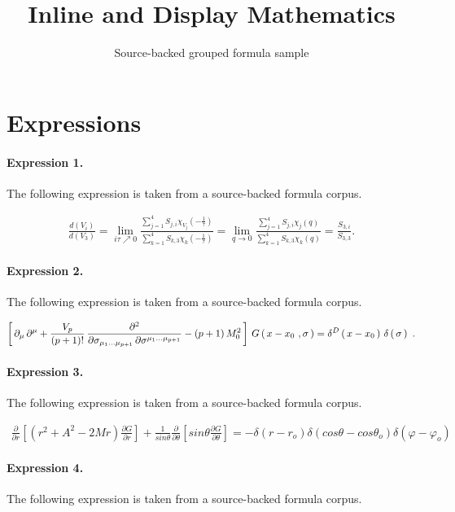\documentclass[11pt]{article}
\title{Inline and Display Mathematics}
\author{Source-backed grouped formula sample}
\date{}
\begin{document}
\maketitle
\section{Expressions}
\paragraph{Expression 1.} The following expression is taken from a source-backed formula corpus.

\begin{align*}\frac{d(V_i)}{d(V_3)} = \lim_{i\tau \nearrow 0}\frac{\sum_{j=1}^4 S_{j,i} \chi^{}_{V_j} (-\frac{1}{\tau})}{\sum_{k=1}^4 S_{k,3} \chi^{}_k (-\frac{1}{\tau})}= \lim_{q \rightarrow 0}\frac{\sum_{j=1}^4 S_{j,i} \chi^{}_{j} (q)}{\sum_{k=1}^4 S_{k,3} \chi^{}_k (q)}= \frac{S_{3,i}}{S_{3,3}}.\end{align*}

\paragraph{Expression 2.} The following expression is taken from a source-backed formula corpus.

\begin{align*}\left[\, \partial_\mu\, \partial^\mu + {V_p\over (p+1)!}\,{\partial^2\over \partial\sigma_{\mu_1\dots\mu_{p+1}}\, \partial\sigma^{\mu_1\dots\mu_{p+1}}} - (p+1)\, M_0^2\, \right]\, G\left(\, x-x_0\ , \sigma\, \right)= \delta^D\left(\, x-x_0\, \right)\,\delta\left(\, \sigma\, \right)\ .\end{align*}

\paragraph{Expression 3.} The following expression is taken from a source-backed formula corpus.

\begin{align*}{\frac {\partial} {\partial r}}\left[(r^2+A^2-2Mr){\frac {\partial G}{\partial r}}\right]+ {\frac{1} {sin\theta}} {\frac {\partial}{\partial \theta}}\left[sin\theta {\frac {\partial G} {\partial\theta}}\right] = -\delta(r-r_o) \delta(cos\theta-cos{\theta}_o)\delta(\varphi-{\varphi}_o)\end{align*}

\paragraph{Expression 4.} The following expression is taken from a source-backed formula corpus.
\end{document}
